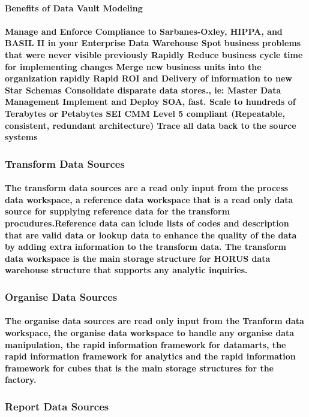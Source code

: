 \documentclass{acm_proc_article-sp}
\begin{document}
\paragraph{Benefits of Data Vault Modeling}
\paragraph{
    Manage and Enforce Compliance to Sarbanes-Oxley, HIPPA, and BASIL II in your Enterprise Data Warehouse
    Spot business problems that were never visible previously
    Rapidly Reduce business cycle time for implementing changes
    Merge new business units into the organization rapidly
    Rapid ROI and Delivery of information to new Star Schemas
    Consolidate disparate data stores., ie: Master Data Management
    Implement and Deploy SOA, fast.
    Scale to hundreds of Terabytes or Petabytes
    SEI CMM Level 5 compliant (Repeatable, consistent, redundant architecture)
    Trace all data back to the source systems}
\subsubsection{Transform Data Sources}
\paragraph{The transform data sources are a read only input from the process data workspace, a reference data workspace that is a read only data source for supplying reference data for the transform procudures.Reference data can iclude lists of codes and description that are valid data or lookup data to enhance the quality of the data by adding extra information to the transform data. The transform data workspace is the main storage structure for HORUS data warehouse structure that supports any analytic inquiries.}
\subsubsection{Organise Data Sources}
\paragraph{The organise data sources are read only input from the Tranform data workspace, the organise data workspace to handle any organise data manipulation, the rapid information framework for datamarts, the rapid information framework for analytics and the rapid information framework for cubes that is the main storage structures for the factory.}
\subsubsection{Report Data Sources}
\end{document}
